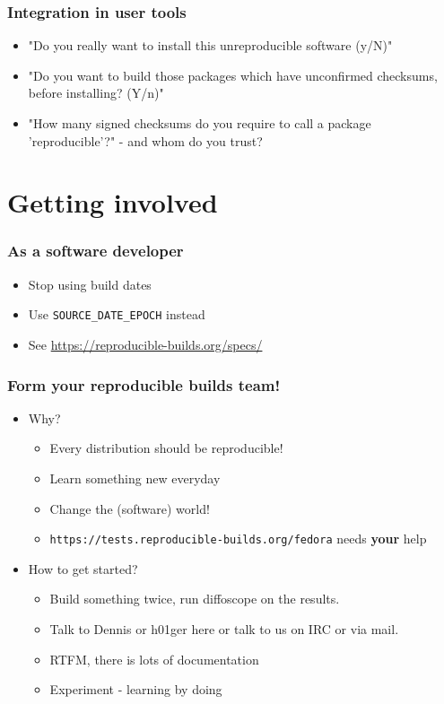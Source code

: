 \documentclass[14pt]{beamer}
\begin{document}
\begin{frame}
 \frametitle{Integration in user tools}
 \begin{itemize}
  \item "Do you really want to install this unreproducible software (y/N)"
  \item<2-3> "Do you want to build those packages which have unconfirmed checksums,
  before installing? (Y/n)"
  \item<3>{ "How many signed checksums do you require to call a package
  'reproducible'?" - and whom do you trust?}
 \end{itemize}
\end{frame}


\section{Getting involved}

\begin{frame}
 \frametitle{As a software developer}
 \begin{itemize}
  \item Stop using build dates
  \item Use \texttt{SOURCE\_DATE\_EPOCH} instead
  \item See \url{https://reproducible-builds.org/specs/}
 \end{itemize}
\end{frame}


\begin{frame}
 \frametitle{Form your reproducible builds team!}
 \begin{itemize}
  \item Why?
   \begin{itemize}
    \item Every distribution should be reproducible!
    \item Learn something new everyday
    \item Change the (software) world!
    \item \texttt{https://tests.reproducible-builds.org/fedora} needs \textbf{your} help
   \end{itemize}
  \item How to get started?
   \begin{itemize}
    \item Build something twice, run diffoscope on the results.
    \item Talk to Dennis or h01ger here or talk to us on IRC or via mail.
    \item RTFM, there is lots of documentation
    \item Experiment - learning by doing
   \end{itemize}
 \end{itemize}
\end{frame}
\end{document}
